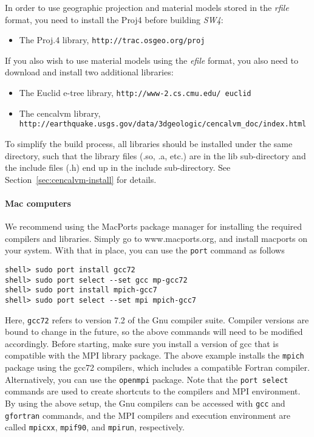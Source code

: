 \documentclass[11pt]{article}
\begin{document}
In order to use geographic projection and material models stored in the \emph{rfile} format, you
need to install the Proj4 before building \emph{SW4}:
\begin{itemize}
\item The Proj.4 library, {\tt http://trac.osgeo.org/proj}
\end{itemize}  
If you also wish to use material models using the \emph{efile} format, you also need to download and
install two additional libraries:
\begin{itemize}
\item The Euclid e-tree library, {\tt http://www-2.cs.cmu.edu/~euclid}
\item The cencalvm library, \\{\tt http://earthquake.usgs.gov/data/3dgeologic/cencalvm\_doc/index.html}
\end{itemize}
To simplify the build process, all libraries should be installed under the same directory, such that
the library files (.so, .a, etc.) are in the lib sub-directory and the include files (.h) end up in
the include sub-directory. See Section~\ref{sec:cencalvm-install} for details.

\paragraph{Mac computers}

We recommend using the MacPorts package manager for installing the required compilers and
libraries. Simply go to www.macports.org, and install macports on your system. With that in place,
you can use the \verb+port+ command as follows
\begin{verbatim}
shell> sudo port install gcc72
shell> sudo port select --set gcc mp-gcc72
shell> sudo port install mpich-gcc7
shell> sudo port select --set mpi mpich-gcc7
\end{verbatim}
Here, \verb+gcc72+ refers to version 7.2 of the Gnu compiler suite. Compiler versions are bound to
change in the future, so the above commands will need to be modified accordingly. Before starting,
make sure you install a version of gcc that is compatible with the MPI library package. The above
example installs the \verb+mpich+ package using the gcc72 compilers, which includes a
compatible Fortran compiler. Alternatively, you can use the \verb+openmpi+ package. Note that the
\verb+port select+ commands are used to create shortcuts to the compilers and MPI environment. By
using the above setup, the Gnu compilers can be accessed with \verb+gcc+ and \verb+gfortran+
commands, and the MPI compilers and execution environment are called \verb+mpicxx+, \verb+mpif90+,
and \verb+mpirun+, respectively.
\end{document}
